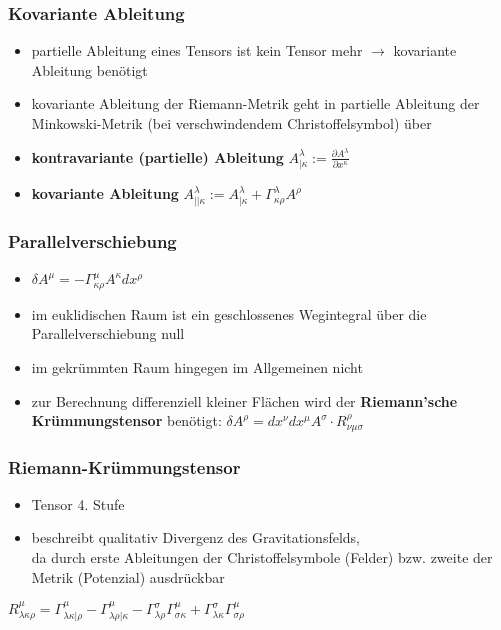 \documentclass{beamer}
\begin{document}
\begin{frame}\frametitle{Kovariante Ableitung}

\begin{itemize}
\item partielle Ableitung eines Tensors ist kein Tensor mehr $\to$ kovariante Ableitung benötigt
\item kovariante Ableitung der Riemann-Metrik geht in partielle Ableitung der Minkowski-Metrik (bei verschwindendem Christoffelsymbol) über
\item \textbf{kontravariante (partielle) Ableitung} $A^{\lambda}_{|\kappa} := \frac{\partial A^{\lambda}}{\partial x^{\kappa}}$
\item \textbf{kovariante Ableitung} $A^{\lambda}_{||\kappa} := A^{\lambda}_{|\kappa} + \Gamma^{\lambda}_{\kappa\rho} A^{\rho}$
\end{itemize}

\end{frame}

\begin{frame}\frametitle{Parallelverschiebung}

\begin{itemize}
\item $\delta A^{\mu} = -\Gamma^{\mu}_{\kappa \rho}A^{\kappa}dx^{\rho}$
\item im euklidischen Raum ist ein geschlossenes Wegintegral über die Parallelverschiebung null
\item im gekrümmten Raum hingegen im Allgemeinen nicht
\item zur Berechnung differenziell kleiner Flächen wird der \textbf{Riemann'sche Krümmungstensor} benötigt: $\delta A^{\rho} = dx^\nu dx^\mu A^\sigma \cdot R^\rho_{\nu \mu \sigma}$
\end{itemize}

\end{frame}

\begin{frame}\frametitle{Riemann-Krümmungstensor}

\begin{itemize}
\item Tensor 4. Stufe
\item beschreibt qualitativ Divergenz des Gravitationsfelds,\\ da durch erste Ableitungen der Christoffelsymbole (Felder) bzw. zweite der Metrik (Potenzial) ausdrückbar
\end{itemize}

\vspace{.5cm}

$R^\mu_{\lambda\kappa\rho} = \Gamma^\mu_{\lambda\kappa|\rho} - \Gamma^\mu_{\lambda\rho|\kappa} - \Gamma^\sigma_{\lambda\rho} \Gamma^\mu_{\sigma\kappa} + \Gamma^\sigma_{\lambda\kappa}\Gamma^\mu_{\sigma\rho}$
\end{frame}
\end{document}
